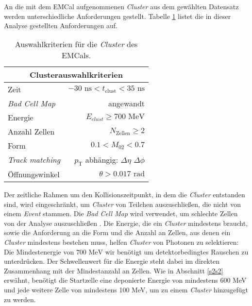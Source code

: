 An die mit dem EMCal aufgenommenen \textit{Cluster} aus dem gewählten Datensatz werden unterschiedliche Anforderungen gestellt.
Tabelle \ref{tab:Cluster} listet die in dieser Analyse gestellten Anforderungen auf.
\begin{table}[b]
\centering
\begin{tabular}{|l|r|}
\hline
\multicolumn{2}{|c|}{Clusterauswahlkriterien}                   \\ \hline \hline
Zeit                    & $-30\text{ ns} < t_\text{clust}<35\text{ ns}$ \\ \hline
\textit{Bad Cell Map}   & angewandt                                     \\ \hline
Energie                 & $E_{clust}\geq700\text{ MeV}$                         \\ \hline
Anzahl Zellen           & $N_\text{Zellen}\geq 2$                       \\ \hline
Form                    & $0.1< M_{02}<0.7$                             \\ \hline
\textit{Track matching} & $p_\text{T}$ abhängig: $\Delta\eta$ $\Delta\phi$                                     \\ \hline
Öffnungswinkel          & $\theta>0.017\text{ rad}$                     \\ \hline
\end{tabular}
\caption{Auswahlkriterien für die \textit{Cluster} des EMCals.}
\label{tab:Cluster}
\end{table}
\newline
Der zeitliche Rahmen um den Kollisionszeitpunkt, in dem die \textit{Cluster} entstanden sind, wird eingeschränkt, um \textit{Cluster} von Teilchen auszuschließen, die nicht von einem \textit{Event} stammen.
Die \textit{Bad Cell Map} wird verwendet, um schlechte Zellen von der Analyse auszuschließen \cite{thesis:Joshua}.
\newline
Die Energie, die ein \textit{Cluster} mindestens braucht, sowie die Anforderung an die Form und die Anzahl an Zellen, aus denen ein \textit{Cluster} mindestens bestehen muss, helfen \textit{Cluster} von Photonen zu selektieren:
Die Mindestenergie von $700\text{ MeV}$ wir benötigt um detektorbedingtes  Rauschen zu unterdrücken.
Der Schwellenwert für die Energie steht dabei im direkten Zusammenhang mit der Mindestanzahl an Zellen.
Wie in Abschnitt \ref{s2s2} erwähnt, benötigt die Startzelle eine deponierte Energie von mindestens 600 MeV und jede weitere Zelle von mindestens 100 MeV, um zu einem \textit{Cluster} hinzugefügt zu werden.

